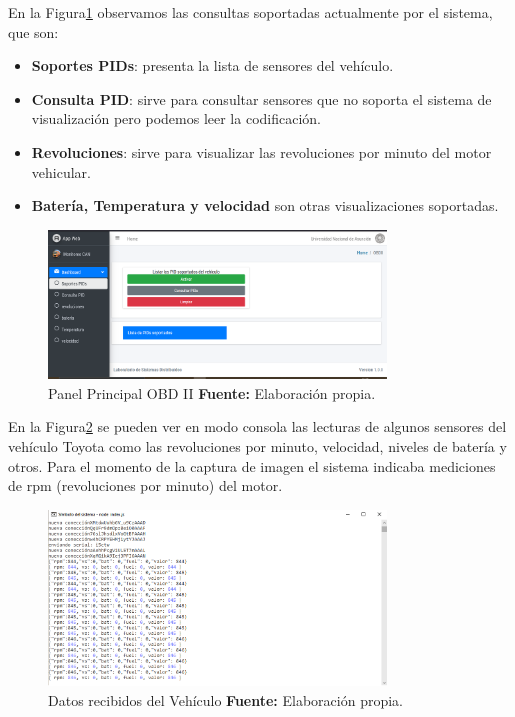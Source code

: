 En la Figura\ref{panel_ref_c6} observamos las consultas soportadas actualmente por el sistema, que son:
\begin{itemize}
    \item \textbf{Soportes PIDs}: presenta la lista de sensores del vehículo. 
    \item \textbf{Consulta PID}: sirve para consultar sensores que no soporta el sistema de visualización pero podemos leer la codificación. 
    \item \textbf{Revoluciones}: sirve para visualizar las revoluciones por minuto del motor vehicular.
    \item \textbf{Batería, Temperatura y velocidad} son otras visualizaciones soportadas.     
\end{itemize}



\begin{figure}[H]
	\centering
	\includegraphics[width=0.8\textwidth]{./Cap6imagen/soportes_fig_c6.png}
	\caption [Panel Principal OBD II.]{Panel Principal OBD II \textbf{ Fuente:} %
		Elaboración propia.}
	\label{panel_ref_c6} %
\end{figure}


En la Figura\ref{consola_ref_c6} se pueden ver en modo consola las lecturas de algunos sensores del vehículo Toyota como las revoluciones por minuto, velocidad, niveles de batería y otros. 
Para el momento de la captura de imagen el sistema indicaba mediciones de rpm (revoluciones por minuto) del motor. 

\begin{figure}[H]
	\centering
	\includegraphics[width=0.8\textwidth]{./Cap6imagen/consola_fig_c6.png}
	\caption [Datos recibidos del Vehículo.]{Datos recibidos del Vehículo \textbf{ Fuente:} %
		Elaboración propia.}
	\label{consola_ref_c6} %
\end{figure}


